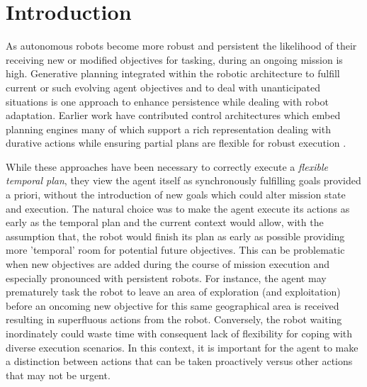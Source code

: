 \section{Introduction}
\label{sec:intro}

As autonomous robots become more robust and persistent the likelihood
of their receiving new or modified objectives for tasking, during an
ongoing mission is high. Generative planning integrated within the
robotic architecture to fulfill current or such evolving agent
objectives and to deal with unanticipated situations is one approach
to enhance persistence while dealing with robot adaptation.  Earlier
work \cite{AmbrosIngerson88,Haigh98,alami:1998p820,mus98,chien99,py10}
have contributed control architectures which embed planning engines
many of which support a rich representation dealing with durative
actions while ensuring partial plans are flexible for robust execution
\cite{lemai04}.


While these approaches have been necessary to correctly execute a
\emph{flexible temporal plan}, they view the agent itself as
synchronously fulfilling goals provided a priori, without the
introduction of new goals which could alter mission state and
execution.
The natural choice was to make the agent execute its actions as early
as the temporal plan and the current context would allow, with the
assumption that, the robot would finish its plan as early as possible
providing more 'temporal' room for potential future objectives.  This
can be problematic when new objectives are added during the course of
mission execution and especially pronounced with persistent
robots. For instance, the agent may prematurely task the robot to
leave an area of exploration (and exploitation) before an oncoming new
objective for this same geographical area is received resulting in
superfluous actions from the robot. Conversely, the robot waiting
inordinately could waste time with consequent lack of flexibility for
coping with diverse execution scenarios. In this context, it is
important for the agent to make a distinction between actions that can
be taken proactively versus other actions that may not be urgent.

